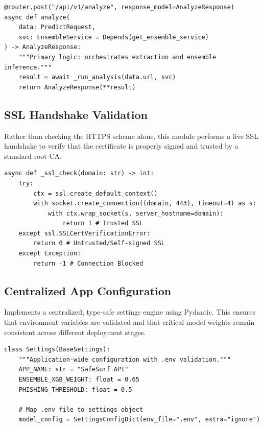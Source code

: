 \begin{listing}[htbp]
\begin{verbatim}
@router.post("/api/v1/analyze", response_model=AnalyzeResponse)
async def analyze(
    data: PredictRequest,
    svc: EnsembleService = Depends(get_ensemble_service)
) -> AnalyzeResponse:
    """Primary logic: orchestrates extraction and ensemble inference."""
    result = await _run_analysis(data.url, svc)
    return AnalyzeResponse(**result)
\end{verbatim}
\caption{FastAPI Core Analysis Router Endpoint (predict.py)}
\label{lst:api_analyze}
\end{listing}


\subsection{SSL Handshake Validation}
\noindent
Rather than checking the HTTPS scheme alone, this module performs a live SSL handshake to verify that the certificate is properly signed and trusted by a standard root CA.
\begin{listing}[htbp]
\begin{verbatim}
async def _ssl_check(domain: str) -> int:
    try:
        ctx = ssl.create_default_context()
        with socket.create_connection((domain, 443), timeout=4) as s:
            with ctx.wrap_socket(s, server_hostname=domain):
                return 1 # Trusted SSL
    except ssl.SSLCertVerificationError:
        return 0 # Untrusted/Self-signed SSL
    except Exception:
        return -1 # Connection Blocked
\end{verbatim}
\caption{Live SSL Handshake Trust Verification (deep\_feature\_extractor.py)}
\label{lst:ssl_validation}
\end{listing}



\subsection{Centralized App Configuration}
\noindent
Implements a centralized, type-safe settings engine using Pydantic. This ensures that environment variables are validated and that critical model weights remain consistent across different deployment stages.

\begin{listing}[htbp]
\begin{verbatim}
class Settings(BaseSettings):
    """Application-wide configuration with .env validation."""
    APP_NAME: str = "SafeSurf API"
    ENSEMBLE_XGB_WEIGHT: float = 0.65
    PHISHING_THRESHOLD: float = 0.5
    
    # Map .env file to settings object
    model_config = SettingsConfigDict(env_file=".env", extra="ignore")
\end{verbatim}
\caption{Centralized Pydantic Configuration System (config.py)}
\label{lst:config_system}
\end{listing}

